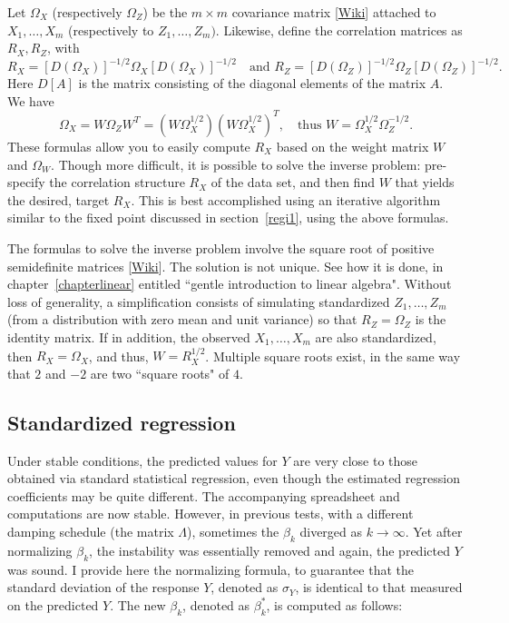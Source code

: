 \documentclass[oneside,10pt]{book}
\begin{document}
Let $\Omega_X$ (respectively $\Omega_Z$) be the $m\times m$ \textcolor{index}{covariance matrix} [\href{https://en.wikipedia.org/wiki/Covariance_matrix}{Wiki}] attached to $X_1,\dots,X_m$
 (respectively to $Z_1,\dots,Z_m)$. Likewise, define the correlation matrices as $R_X, R_Z$, with
$$R_X=[D(\Omega_X)]^{-1/2}\Omega_X [D(\Omega_X)]^{-1/2}\quad \text{and } R_Z=[D(\Omega_Z)]^{-1/2}\Omega_Z [D(\Omega_Z)]^{-1/2}.$$
Here $D[A]$ is the matrix consisting of the diagonal elements of the matrix $A$.
We have
$$\Omega_X=W\Omega_Z W^T=(W\Omega_X^{1/2})(W\Omega_X^{1/2})^T,\quad \text{thus } W=\Omega_X^{1/2}\Omega_Z^{-1/2}.$$
These formulas allow you to easily compute $R_X$ based on the weight matrix $W$ and $\Omega_W$. Though more difficult, it is possible to solve the inverse problem: pre-specify the correlation structure $R_X$ of the data set, and then
find $W$ that yields the desired, target $R_X$. This is best accomplished using an iterative algorithm similar to the fixed point discussed in section~\ref{regi1}, using the above formulas.

The formulas to solve the inverse problem involve  the \textcolor{index}{square root} of \textcolor{index}{positive semidefinite matrices} [\href{https://en.wikipedia.org/wiki/Square_root_of_a_matrix}{Wiki}]. The solution is not unique. See how it is done, in chapter~\ref{chapterlinear} entitled ``gentle introduction to linear algebra". Without loss of generality, a simplification consists of simulating standardized $Z_1,\dots,Z_m$ (from a distribution with zero mean and unit variance) so that $R_Z=\Omega_Z$  is the identity matrix. If in addition, the observed $X_1,\dots,X_m$ are also standardized, then $R_X=\Omega_X$, and thus,
$W=R_X^{1/2}$. Multiple square roots exist, in the same way that $2$ and $-2$ are two ``square roots" of $4$.

\subsection{Standardized regression}

Under stable conditions,  the predicted values for $Y$ are very close to those obtained via standard statistical regression,
even though the estimated regression coefficients may be quite different. The accompanying spreadsheet and computations are now stable. However,
in previous tests, with a different damping schedule (the matrix $\Lambda$),  sometimes the $\beta_k$ diverged as $k\rightarrow\infty$.  Yet after normalizing $\beta_k$, the instability was essentially removed and again, the predicted $Y$ was sound. I provide here the normalizing formula, to guarantee that the standard deviation of the response $Y$, denoted as $\sigma_Y$, is identical to that measured on the predicted $Y$. The new $\beta_k$, denoted as $\beta_k^*$, is computed as follows:
\end{document}
